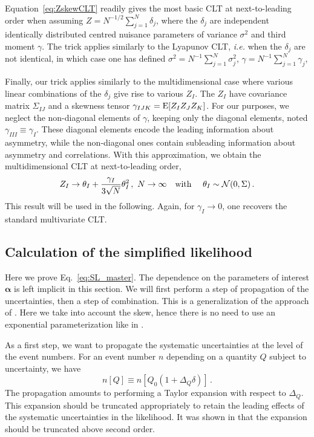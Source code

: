 \documentclass[11pt]{article}
\newcommand{\be}{\begin{equation}}
\newcommand{\ee}{\end{equation}}
\begin{document}
Equation~\eqref{eq:ZskewCLT}  readily gives the most basic CLT at next-to-leading order when assuming $Z=N^{-1/2}\sum_{j=1}^N \delta_j$, where the $\delta_j$ are  independent identically distributed centred nuisance parameters  of variance $\sigma^2$ and third moment $\gamma$. The trick applies similarly to the Lyapunov CLT, \textit{i.e.} when the $\delta_j$ are not identical, in which case one has defined $\sigma^2=N^{-1}\sum_{j=1}^N \sigma_j^2$, $\gamma=N^{-1}\sum_{j=1}^N \gamma_j$,

Finally, our trick applies similarly to the multidimensional case where various linear combinations of the $\delta_j$ give rise to various $Z_I$. The $Z_I$ have covariance matrix $\Sigma_{IJ}$ and a skewness tensor $\gamma_{IJK}={\rm E}[Z_IZ_JZ_K]$. For our purposes, we neglect the non-diagonal elements of $\gamma$, keeping only  the diagonal elements, noted $\gamma_{III}\equiv \gamma_I$. These diagonal elements encode the leading information about asymmetry, while the non-diagonal ones contain subleading information about asymmetry and correlations. With this approximation, we obtain the multidimensional CLT at next-to-leading order,
\be
Z_I\rightarrow \theta_I+\frac{\gamma_{I}}{3\sqrt{N}}\theta_I^2\,,\,\,N\rightarrow \infty  \quad \textrm{with } \quad \theta_I\sim{\cal N}(0,\Sigma)\,.
\ee
 This  result will be used in the following. Again, for $\gamma_I\rightarrow 0$, one recovers the standard multivariate CLT.





\subsection{Calculation of the simplified likelihood}
\label{se:analytic}

Here we prove Eq.~\eqref{eq:SL_master}.  The dependence on the parameters of interest $\bm{\alpha}$ is left implicit in this section. We will first perform a step of  propagation of the uncertainties, then a step of combination. This is a generalization of the approach of \cite{Fichet:2016gvx}. Here we take into account the skew, hence there is no need to use an exponential parameterization like in \cite{Fichet:2016gvx}.




As a first step, we want to propagate the systematic uncertainties at the level of the event numbers.  For an event number $n$ depending on a quantity $Q$ subject to uncertainty, we have
\be n[Q]\equiv n[Q_0(1+\Delta_Q \delta)]\,.
\ee
The propagation amounts to performing a Taylor expansion with respect to $\Delta_Q $. This expansion should be truncated appropriately  to retain the leading effects of the systematic uncertainties in the likelihood. It was shown in \cite{Fichet:2016gvx} that  the expansion should be truncated above second order.
\end{document}
